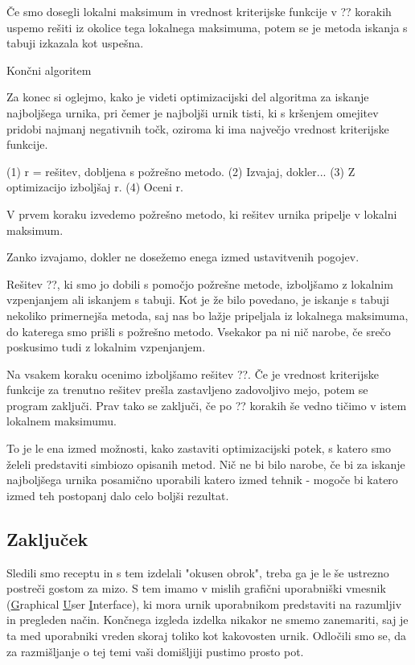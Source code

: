 \documentclass[a4paper]{article}
\begin{document}
Če smo dosegli lokalni maksimum in vrednost kriterijske funkcije v ?? korakih uspemo
rešiti iz okolice tega lokalnega maksimuma, potem se je metoda iskanja s tabuji izkazala
kot uspešna.

Končni algoritem %

Za konec si oglejmo, kako je videti optimizacijski del algoritma za iskanje najboljšega
urnika, pri čemer je najboljši urnik tisti, ki s kršenjem omejitev pridobi najmanj negativnih
točk, oziroma ki ima največjo vrednost kriterijske funkcije.

(1) r = rešitev, dobljena s požrešno metodo.
(2) Izvajaj, dokler...
{
   (3) Z optimizacijo izboljšaj r.
   (4) Oceni r.
}

   V prvem koraku izvedemo požrešno metodo, ki rešitev urnika pripelje v lokalni maksimum.

   Zanko izvajamo, dokler ne dosežemo enega izmed ustavitvenih pogojev.

   Rešitev ??, ki smo jo dobili s pomočjo požrešne metode, izboljšamo z lokalnim vzpenjanjem
   ali iskanjem s tabuji. Kot je že bilo povedano, je iskanje s tabuji nekoliko primernejša metoda,
   saj nas bo lažje pripeljala iz lokalnega maksimuma, do katerega smo prišli s požrešno metodo.
   Vsekakor pa ni nič narobe, če srečo poskusimo tudi z lokalnim vzpenjanjem.

   Na vsakem koraku ocenimo izboljšamo rešitev ??. Če je vrednost kriterijske funkcije
   za trenutno rešitev prešla zastavljeno zadovoljivo mejo, potem se program zaključi. Prav tako
   se zaključi, če po ?? korakih še vedno tičimo v istem lokalnem maksimumu.

To je le ena izmed možnosti, kako zastaviti optimizacijski potek, s katero smo želeli predstaviti
simbiozo opisanih metod. Nič ne bi bilo narobe, če bi za iskanje najboljšega urnika posamično
uporabili katero izmed tehnik - mogoče bi katero izmed teh postopanj dalo celo boljši rezultat.

\subsection{Zaključek} %

Sledili smo receptu in s tem izdelali "okusen obrok", treba ga je le še ustrezno postreči
gostom za mizo. S tem imamo v mislih grafični uporabniški vmesnik (\underline{G}raphical
\underline{U}ser \underline{I}nterface), ki mora urnik uporabnikom predstaviti na razumljiv in
pregleden način. Končnega izgleda izdelka nikakor ne smemo zanemariti, saj je ta med uporabniki
vreden skoraj toliko kot kakovosten urnik. Odločili smo se, da za razmišljanje o tej temi vaši
domišljiji pustimo prosto pot.
\end{document}

